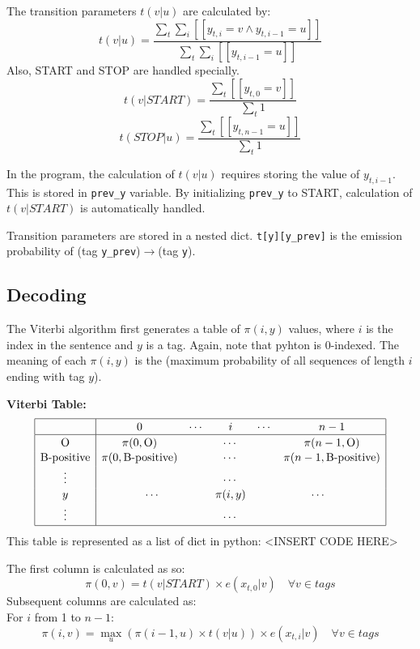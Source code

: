 \documentclass[12pt]{article}
\begin{document}
The transition parameters \(t(v|u)\) are calculated by:
\[ t(v|u) = \frac{\sum_t \sum_i [[y_{t,i}=v \land y_{t,i-1}=u]] }{\sum_{t} \sum_i [[y_{t,i-1}=u]] } \]
Also, START and STOP are handled specially.
\[ t(v|START) = \frac{\sum_t [[y_{t,0}=v]] }{\sum_{t} 1 } \]
\[ t(STOP|u) = \frac{\sum_t [[y_{t,n-1}=u]] }{\sum_{t} 1 } \]

In the program, the calculation of \(t(v|u)\) requires storing the value of \(y_{t,i-1}\). This is stored in \verb|prev_y| variable. By initializing \verb|prev_y| to START, calculation of \(t(v|START)\) is automatically handled.

Transition parameters are stored in a nested dict. \verb|t[y][y_prev]| is the emission probability of (tag \verb|y_prev|)\(\rightarrow\)(tag \verb|y|).

\subsection{Decoding}

The Viterbi algorithm first generates a table of \(\pi(i,y)\) values, where \(i\) is the index in the sentence and \(y\) is a tag. Again, note that pyhton is 0-indexed. The meaning of each \(\pi(i,y)\) is the (maximum probability of all sequences of length \(i\) ending with tag \(y\)).

\textbf{Viterbi Table:}
\[
\begin{array}{|c|ccccc|}
\hline \rule{0pt}{1em}
& 0 & \cdots & i & \cdots & n-1 \\
\hline \rule{0pt}{1em}
\mbox{O}          & \pi(0,\mbox{O}) & \multicolumn{3}{c}{\cdots} & \pi(n-1,\mbox{O}) \\[0.1em]
\mbox{B-positive} & \pi(0,\mbox{B-positive}) & \multicolumn{3}{c}{\cdots} & \pi(n-1,\mbox{B-positive}) \\[0.1em]
\vdots &          & \multicolumn{3}{c}{\cdots} &            \\[0.1em]
y      & \multicolumn{2}{c}{\cdots} & \pi(i,y) & \multicolumn{2}{c|}{\cdots} \\[0.1em]
\vdots &          & \multicolumn{3}{c}{\cdots} &            \\[0.1em]
\hline
\end{array}
\]
This table is represented as a list of dict in python:
<INSERT CODE HERE>

The first column is calculated as so:
\[ \pi(0,v) = t(v|START) \times e(x_{t,0}|v) \quad \forall v \in {tags}\]
Subsequent columns are calculated as:\\
For \(i\) from 1 to \(n-1\):
\[ \pi(i,v) = \max_u \left( \pi(i-1,u) \times t(v|u) \right) \times e(x_{t,i}|v) \quad \forall v \in {tags}\]
\end{document}
